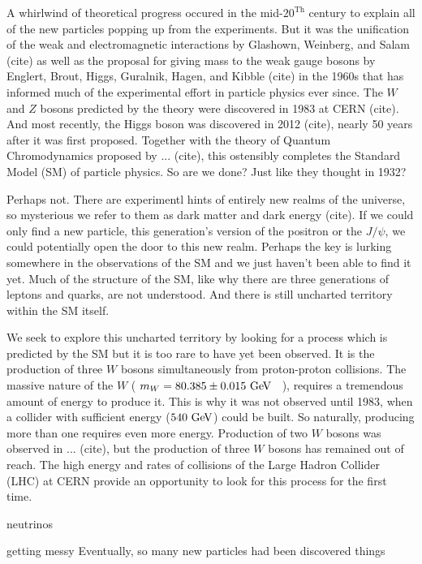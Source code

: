A whirlwind of theoretical progress occured in the mid-$20^{\textrm{Th}}$ century
to explain all of the new particles popping up from the experiments. 
But it was the unification of the weak and electromagnetic interactions
by Glashown, Weinberg, and Salam (cite) as well as the proposal for giving
mass to the weak gauge bosons by Englert, Brout, Higgs, Guralnik, Hagen,
and Kibble (cite) in the 1960s that has informed much of the experimental effort in particle
physics ever since. The $W$ and $Z$ bosons predicted by the theory were discovered in 
1983 at CERN (cite). And most recently, the Higgs boson was discovered in 2012 (cite),
nearly 50 years after it was first proposed. Together with the theory of Quantum Chromodynamics
proposed by ... (cite), this ostensibly completes the Standard Model (SM) of particle physics. 
So are we done? Just like they thought in 1932?


Perhaps not. There are experimentl hints of entirely new realms of the universe, 
so mysterious we refer to them as dark matter and dark energy (cite). 
If we could only find a new particle, this generation's version of the positron
or the $J/\psi$, we could potentially open the door to this new realm.
Perhaps the key is lurking somewhere in the observations of the SM and we just haven't been 
able to find it yet.  Much of the structure
of the SM, like why there are three generations of leptons and quarks, are not understood.
And there is still uncharted territory within the SM itself.

We seek to explore this uncharted territory by looking for a process which is predicted
by the SM but it is too rare to have yet been observed. It is the production of 
three $W$ bosons simultaneously from proton-proton collisions. The massive nature of the 
$W$ ( $m_W = 80.385 \pm 0.015\GeV$~\cite{PDG:2014} ), requires a tremendous amount of energy 
to produce it. This is why it was not observed until 1983, when a collider with sufficient
energy ($540 \GeV$) could be built. So naturally, producing more than one requires
even more energy. Production of two $W$ bosons was observed in ... (cite), but 
the production of three $W$ bosons has remained out of reach. 
The high energy and rates of collisions of the Large Hadron Collider (LHC) at CERN
provide an opportunity to look for this process for the first time. 







neutrinos

getting messy
Eventually, so many new particles had been discovered things 


